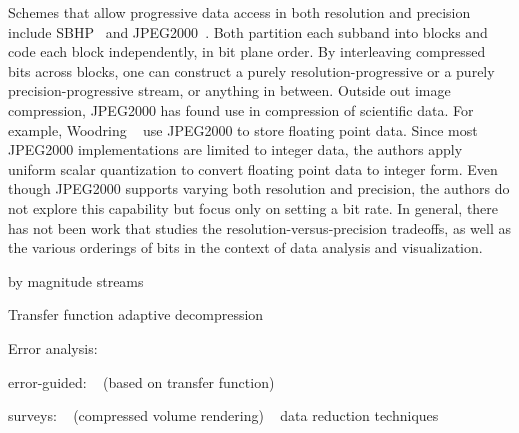 Schemes that allow progressive data access in both resolution and precision include
SBHP~\cite{sbhp2000} and JPEG2000~\cite{jpeg2000}. Both partition each subband into blocks and code
each block independently, in bit plane order. By interleaving compressed bits across blocks, one can
construct a purely resolution-progressive or a purely precision-progressive stream, or anything in
between. Outside out image compression, JPEG2000 has found use in compression of scientific data.
For example, Woodring \etal~\cite{woodring2011} use JPEG2000 to store floating point data. Since
most JPEG2000 implementations are limited to integer data, the authors apply uniform scalar
quantization to convert floating point data to integer form. Even though JPEG2000 supports varying
both resolution and precision, the authors do not explore this capability but focus only on setting
a bit rate. In general, there has not been work that studies the resolution-versus-precision
tradeoffs, as well as the various orderings of bits in the context of data analysis and
visualization.

by magnitude streams~\cite{image_compression1992}

Transfer function adaptive decompression~\cite{tf_decompression2004}

Error analysis:
~\cite{evaluating-compression-climate}
~\cite{compression_sim2013}
~\cite{statistical-volume-quality}
~\cite{evaluating-efficacy-wavelet}
~\cite{topology-verification-isosurface}
~\cite{verifiable-isosurface}
~\cite{verifying-volume-rendering}
~\cite{statistical-volume-quality}

error-guided: 
~\cite{tf_decompression2004} (based on transfer function)

surveys:
~\cite{state-of-the-art-compressed-volume} (compressed volume rendering)
~\cite{li2018} data reduction techniques

